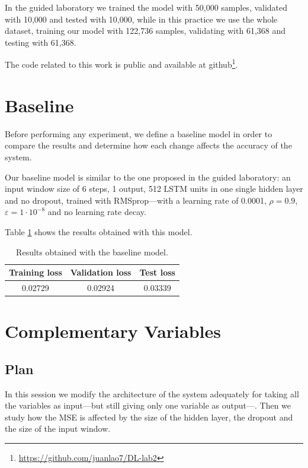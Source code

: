 \documentclass[]{article}
\begin{document}
	In the guided laboratory we trained the model with 50,000 samples, validated with 10,000 and tested with 10,000, while in this practice we use the whole dataset, training our model with 122,736 samples, validating with 61,368 and testing with 61,368.
	
	The code related to this work is public and available at github\footnote{\url{https://github.com/juanlao7/DL-lab2}}.
	
	\section{Baseline}
	
	Before performing any experiment, we define a baseline model in order to compare the results and determine how each change affects the accuracy of the system.
	
	Our baseline model is similar to the one proposed in the guided laboratory: an input window size of 6 steps, 1 output, 512 LSTM units in one single hidden layer and no dropout, trained with RMSprop---with a learning rate of 0.0001, $ \rho = 0.9 $, $ \varepsilon = 1 \cdot 10^{-8} $ and no learning rate decay.
	
	Table \ref{t:baseline} shows the results obtained with this model.
	
	\begin{table}[H]
		\centering
		\begin{tabular}{@{}ccc@{}}
			\toprule
			Training loss & Validation loss & Test loss \\ \midrule
			0.02729       & 0.02924         & 0.03339   \\ \bottomrule
		\end{tabular}
		\caption{Results obtained with the baseline model.}
		\label{t:baseline}
	\end{table}
	
	\section{Complementary Variables}
	
	\subsection{Plan}
	
	In this session we modify the architecture of the system adequately for taking all the variables as input---but still giving only one variable as output---. Then we study how the MSE is affected by the size of the hidden layer, the dropout and the size of the input window.
	
\end{document}
